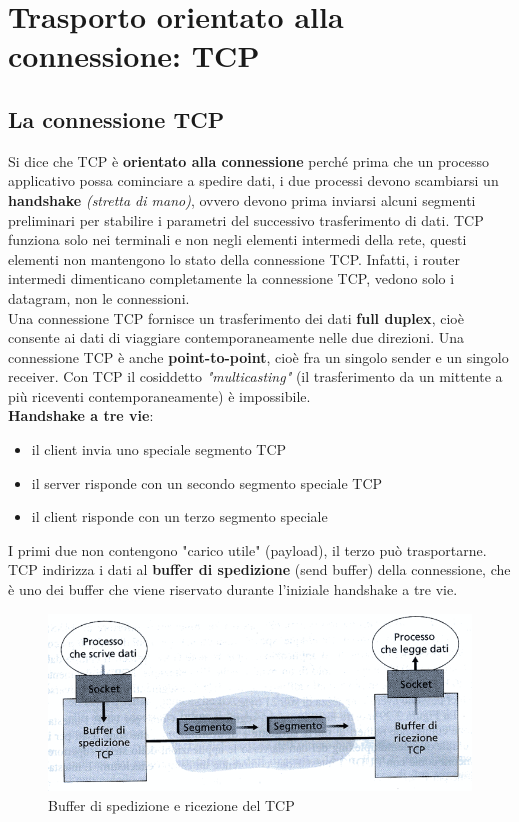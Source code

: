 \documentclass[11pt,a4paper]{book}
\begin{document}
\section{Trasporto orientato alla connessione: TCP}
\subsection{La connessione TCP}
Si dice che TCP è \textbf{orientato alla connessione} perché prima che un processo applicativo possa cominciare a spedire dati, i due processi devono scambiarsi un \textbf{handshake} \textit{(stretta di mano)}, ovvero devono prima inviarsi alcuni segmenti preliminari per stabilire i parametri del successivo trasferimento di dati.
TCP funziona solo nei terminali e non negli elementi intermedi della rete, questi elementi non mantengono lo stato della connessione TCP. Infatti, i router intermedi dimenticano completamente la connessione TCP, vedono solo i datagram, non le connessioni. \\
Una connessione TCP fornisce un trasferimento dei dati \textbf{full duplex}, cioè consente ai dati di viaggiare contemporaneamente nelle due direzioni. Una connessione TCP è anche \textbf{point-to-point}, cioè fra un singolo sender e un singolo receiver. Con TCP il cosiddetto \emph{"multicasting"} (il trasferimento da un mittente a più riceventi contemporaneamente) è impossibile. \\
\textbf{Handshake a tre vie}:
\begin{itemize}
	\item il client invia uno speciale segmento TCP
	\item il server risponde con un secondo segmento speciale TCP
	\item il client risponde con un terzo segmento speciale
\end{itemize}
I primi due non contengono "carico utile" (payload), il terzo può trasportarne. \\
TCP indirizza i dati al \textbf{buffer di spedizione} (send buffer) della connessione, che è uno dei buffer che viene riservato durante l'iniziale handshake a tre vie.
\begin{figure}
	\includegraphics[scale=0.6]{img/030.png}
	\caption{Buffer di spedizione e ricezione del TCP}
\end{figure}
\end{document}
